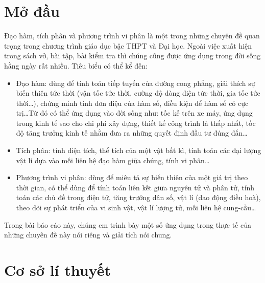 \documentclass[13pt]{article}
\begin{document}
\section{Mở đầu}
Đạo hàm, tích phân và phương trình vi phân là một trong những chuyên đề quan trọng trong chương trình giáo dục bậc THPT và Đại học. Ngoài việc xuất hiện trong sách vở, bài tập, bài kiểm tra thì chúng cũng được ứng dụng trong đời sống hằng ngày rất nhiều. Tiêu biểu có thể kể đến:
\begin{itemize}
    \item Đạo hàm: dùng để tính toán tiếp tuyến của đường cong phẳng, giải thích sự biến thiên tức thời (vận tốc tức thời, cường độ dòng điện tức thời, gia tốc tức thời\dots), chứng minh tính đơn điệu của hàm số, điều kiện để hàm số có cực trị\dots Từ đó có thể ứng dụng vào đời sống như: tốc kế trên xe máy, ứng dụng trong kinh tế sao cho chi phí xây dựng, thiết kế công trình là thấp nhất, tốc độ tăng trưởng kinh tế nhằm đưa ra những quyết định đầu tư đúng đắn\dots
    \item Tích phân: tính diện tích, thể tích của một vật bất kì, tính toán các đại lượng vật lí dựa vào mối liên hệ đạo hàm giữa chúng, tính vi phân\dots
    \item Phương trình vi phân: dùng để miêu tả sự biến thiên của một giá trị theo thời gian, có thể dùng để tính toán liên kết giữa nguyên tử và phân tử, tính toán các chủ đề trong điện tử, tăng trưởng dân số, vật lí (dao động điều hoà), theo dõi sự phát triển của vi sinh vật, vật lí lượng tử, mối liên hệ cung-cầu\dots
\end{itemize}
Trong bài báo cáo này, chúng em trình bày một số ứng dụng trong thực tế của những chuyên đề này nói riêng và giải tích nói chung.
\newpage
\section{Cơ sở lí thuyết}
\end{document}
